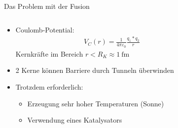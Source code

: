 \begin{frame}{Das Problem mit der Fusion}
    \begin{columns}
        \begin{column}{0.55\textwidth}
            \begin{itemize}
                \item<+-> Coulomb-Potential: \begin{align}V_C(r) = \frac{1}{4 \pi \varepsilon_0} \frac{q_1*q_2}{r}\end{align} Kernkräfte im Bereich $r < R_K \approx \SI{1}{\femto\m}$
                \item<+-> 2 Kerne können Barriere durch Tunneln überwinden
                \item<+-> Trotzdem erforderlich:
                \begin{itemize}
                    \item<+-> Erzeugung sehr hoher Temperaturen (Sonne)
                    \item<+-> Verwendung eines Katalysators
                \end{itemize}
            \end{itemize}
        \end{column}
        \begin{column}{0.45\textwidth}
            \begin{center}
            \end{center}
        \end{column}
    \end{columns}
\end{frame}

